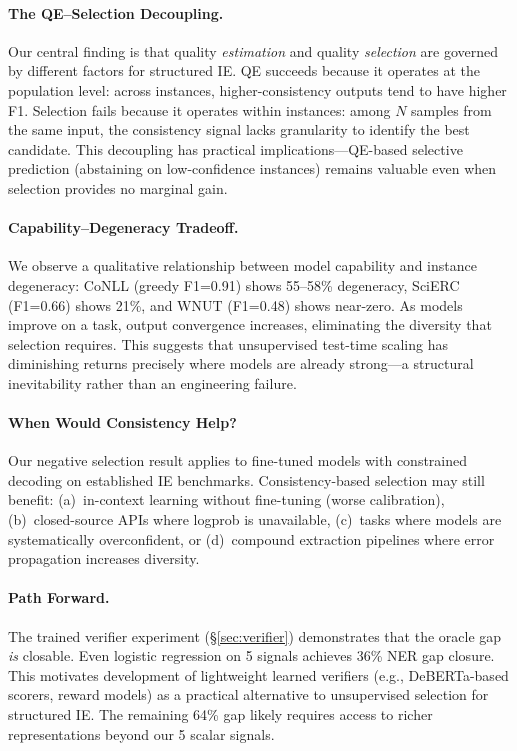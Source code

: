 \documentclass[11pt,a4paper]{article}
\begin{document}
\paragraph{The QE--Selection Decoupling.}
Our central finding is that quality \emph{estimation} and quality \emph{selection} are governed by different factors for structured IE. QE succeeds because it operates at the population level: across instances, higher-consistency outputs tend to have higher F1. Selection fails because it operates within instances: among $N$ samples from the same input, the consistency signal lacks granularity to identify the best candidate. This decoupling has practical implications---QE-based selective prediction (abstaining on low-confidence instances) remains valuable even when selection provides no marginal gain.

\paragraph{Capability--Degeneracy Tradeoff.}
We observe a qualitative relationship between model capability and instance degeneracy: CoNLL (greedy F1=0.91) shows 55--58\% degeneracy, SciERC (F1=0.66) shows 21\%, and WNUT (F1=0.48) shows near-zero. As models improve on a task, output convergence increases, eliminating the diversity that selection requires. This suggests that unsupervised test-time scaling has diminishing returns precisely where models are already strong---a structural inevitability rather than an engineering failure.

\paragraph{When Would Consistency Help?}
Our negative selection result applies to fine-tuned models with constrained decoding on established IE benchmarks. Consistency-based selection may still benefit: (a)~in-context learning without fine-tuning (worse calibration), (b)~closed-source APIs where logprob is unavailable, (c)~tasks where models are systematically overconfident, or (d)~compound extraction pipelines where error propagation increases diversity.

\paragraph{Path Forward.}
The trained verifier experiment (\S\ref{sec:verifier}) demonstrates that the oracle gap \emph{is} closable. Even logistic regression on 5 signals achieves 36\% NER gap closure. This motivates development of lightweight learned verifiers (e.g., DeBERTa-based scorers, reward models) as a practical alternative to unsupervised selection for structured IE. The remaining 64\% gap likely requires access to richer representations beyond our 5 scalar signals.
\end{document}
